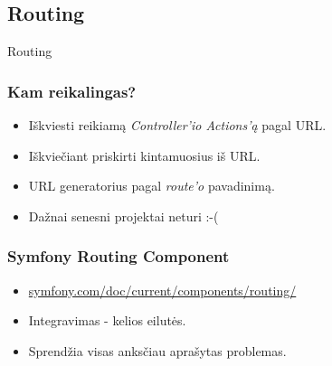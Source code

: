 \documentclass[12pt,a4paper]{beamer}
\begin{document}
\subsection{Routing}
\begin{frame}[fragile]

    {\Huge Routing}
\end{frame}
\begin{frame}
    \frametitle{Kam reikalingas?}

    \begin{itemize}
        \item Iškviesti reikiamą \textit{Controller'io Actions'ą} pagal URL.
        \item Iškviečiant priskirti kintamuosius iš URL.
        \item URL generatorius pagal \textit{route'o} pavadinimą.
        \item Dažnai senesni projektai neturi :-(
    \end{itemize}
\end{frame}
\begin{frame}
    \frametitle{Symfony Routing Component}

    \begin{itemize}
        \item \url{symfony.com/doc/current/components/routing/}
        \item Integravimas - kelios eilutės.
        \item Sprendžia visas anksčiau aprašytas problemas.
    \end{itemize}
\end{frame}
\end{document}
